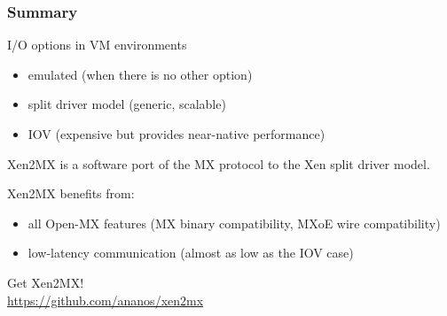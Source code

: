 \documentclass[red,slidestop,notes,compress,mathserif]{beamer}
\begin{document}
\begin{frame}
\frametitle{Summary}
\begin{block}{I/O options in VM environments}
\begin{itemize}
\item emulated (when there is no other option)
\item split driver model (generic, scalable)
\item IOV (expensive but provides near-native performance)
\end{itemize}
\end{block}
\begin{block}{Xen2MX}
is a software port of the MX protocol to the Xen split driver model.
\end{block}
\begin{block}{Xen2MX benefits from:}
\begin{itemize}
\item all Open-MX features (MX binary compatibility, MXoE wire compatibility)
\item low-latency communication (almost as low as the IOV case)
\end{itemize}
\end{block}

Get Xen2MX!\\ \url{https://github.com/ananos/xen2mx}

\end{frame}
\end{document}
